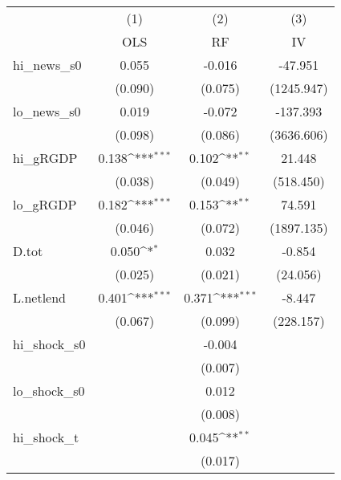 {
\def\sym#1{\ifmmode^{#1}\else\(^{#1}\)\fi}
\begin{tabular}{l*{3}{c}}
\toprule
            &\multicolumn{1}{c}{(1)}&\multicolumn{1}{c}{(2)}&\multicolumn{1}{c}{(3)}\\
            &\multicolumn{1}{c}{OLS}&\multicolumn{1}{c}{RF}&\multicolumn{1}{c}{IV}\\
\midrule
hi\_news\_s0  &       0.055         &      -0.016         &     -47.951         \\
            &     (0.090)         &     (0.075)         &  (1245.947)         \\
\addlinespace
lo\_news\_s0  &       0.019         &      -0.072         &    -137.393         \\
            &     (0.098)         &     (0.086)         &  (3636.606)         \\
\addlinespace
hi\_gRGDP    &       0.138\sym{***}&       0.102\sym{**} &      21.448         \\
            &     (0.038)         &     (0.049)         &   (518.450)         \\
\addlinespace
lo\_gRGDP    &       0.182\sym{***}&       0.153\sym{**} &      74.591         \\
            &     (0.046)         &     (0.072)         &  (1897.135)         \\
\addlinespace
D.tot       &       0.050\sym{*}  &       0.032         &      -0.854         \\
            &     (0.025)         &     (0.021)         &    (24.056)         \\
\addlinespace
L.netlend   &       0.401\sym{***}&       0.371\sym{***}&      -8.447         \\
            &     (0.067)         &     (0.099)         &   (228.157)         \\
\addlinespace
hi\_shock\_s0 &                     &      -0.004         &                     \\
            &                     &     (0.007)         &                     \\
\addlinespace
lo\_shock\_s0 &                     &       0.012         &                     \\
            &                     &     (0.008)         &                     \\
\addlinespace
hi\_shock\_t  &                     &       0.045\sym{**} &                     \\
            &                     &     (0.017)         &                     \\

\end{tabular}}
